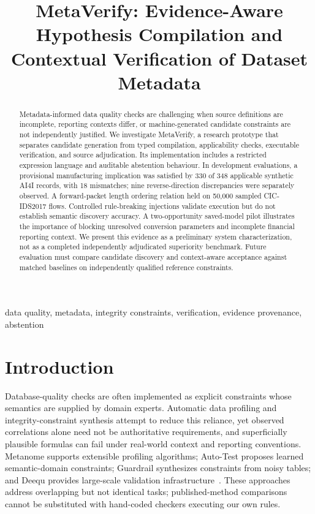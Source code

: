 \documentclass[conference]{IEEEtran}
\title{MetaVerify: Evidence-Aware Hypothesis Compilation and Contextual Verification of Dataset Metadata}
\author{\IEEEauthorblockN{Author names to be confirmed before submission}
\IEEEauthorblockA{Affiliations and ORCIDs to be inserted by the authors}}
\begin{document}
\maketitle

\begin{abstract}
Metadata-informed data quality checks are challenging when source definitions are incomplete, reporting contexts differ, or machine-generated candidate constraints are not independently justified. We investigate MetaVerify, a research prototype that separates candidate generation from typed compilation, applicability checks, executable verification, and source adjudication. Its implementation includes a restricted expression language and auditable abstention behaviour. In development evaluations, a provisional manufacturing implication was satisfied by 330 of 348 applicable synthetic AI4I records, with 18 mismatches; nine reverse-direction discrepancies were separately observed. A forward-packet length ordering relation held on 50,000 sampled CIC-IDS2017 flows. Controlled rule-breaking injections validate execution but do not establish semantic discovery accuracy. A two-opportunity saved-model pilot illustrates the importance of blocking unresolved conversion parameters and incomplete financial reporting context. We present this evidence as a preliminary system characterization, not as a completed independently adjudicated superiority benchmark. Future evaluation must compare candidate discovery and context-aware acceptance against matched baselines on independently qualified reference constraints.
\end{abstract}

\begin{IEEEkeywords}
data quality, metadata, integrity constraints, verification, evidence provenance, abstention
\end{IEEEkeywords}

\section{Introduction}
Database-quality checks are often implemented as explicit constraints whose semantics are supplied by domain experts. Automatic data profiling and integrity-constraint synthesis attempt to reduce this reliance, yet observed correlations alone need not be authoritative requirements, and superficially plausible formulas can fail under real-world context and reporting conventions. Metanome supports extensible profiling algorithms; Auto-Test proposes learned semantic-domain constraints; Guardrail synthesizes constraints from noisy tables; and Deequ provides large-scale validation infrastructure~\cite{metanome,chen2025autotest,ma2025guardrail,schelter2018deequ}. These approaches address overlapping but not identical tasks; published-method comparisons cannot be substituted with hand-coded checkers executing our own rules.
\end{document}
